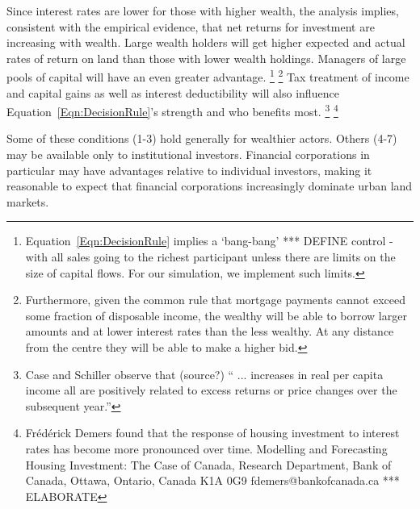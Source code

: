 Since interest rates are lower for those with higher wealth, the analysis implies, consistent with the empirical evidence, that net returns for investment are increasing with wealth. Large wealth holders will get higher expected and actual rates of return on land than those with lower wealth holdings. Managers of large pools of capital will have an even greater advantage. \footnote{ Equation~\ref{Eqn:DecisionRule} implies a `bang-bang' *** DEFINE control - with all sales going to the richest participant unless there are limits on the size of capital flows. For our simulation, we implement such limits. } \footnote{Furthermore, given the  common rule that mortgage payments cannot exceed some fraction of disposable income, the wealthy will be able to borrow larger amounts and at lower interest rates than the less wealthy. At any distance from the centre they will be able to make a higher bid.} %
Tax treatment of income and capital gains as well as interest deductibility will also influence Equation~\ref{Eqn:DecisionRule}'s strength and who benefits most. \footnote{Case and Schiller observe that (source?) 
`` ... increases in real per capita income all are positively related to excess returns or price changes over the subsequent year.''} 
\footnote{Fr\'ed\'erick Demers found that the response of housing investment to interest rates has become more pronounced over time. Modelling and Forecasting Housing Investment: The Case of Canada,  Research Department, Bank of Canada, Ottawa, Ontario, Canada K1A 0G9 fdemers@bankofcanada.ca *** ELABORATE} 

Some  of these conditions (1-3) hold generally for wealthier actors. Others (4-7) may be available only to institutional investors.  Financial corporations in particular may have advantages relative to individual investors, making it  reasonable to expect that financial corporations increasingly dominate urban land markets. %

